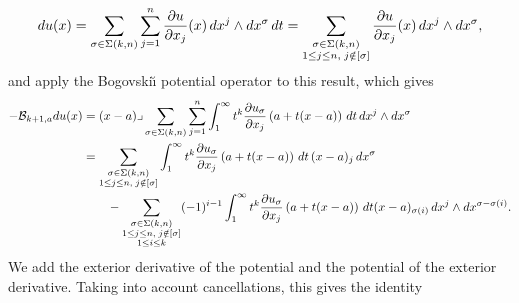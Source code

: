 \documentclass[10pt,a4paper]{article}
\begin{document}
\begin{align*}
    d u(x)
    =
    \sum_{\sigma \in \Sigma(k,n)} \sum_{j=1}^{n}
    \frac{ \partial u }{\partial x_{j}}(x) \,dx^{j} \wedge dx^{\sigma} \,dt 
    =
    \sum_{\substack{ \sigma \in \Sigma(k,n) \\ 1 \leq j \leq n, \; j \notin [\sigma] }}
    \frac{ \partial u }{\partial x_{j}}(x) \,dx^{j} \wedge dx^{\sigma} 
    ,
\end{align*}
and apply the Bogovski\u{\i} potential operator to this result, which gives 
\begin{align*}
    - 
    {\mathcal B}_{k+1,a} d u(x)
    &=
    (x-a)\lrcorner 
    \sum_{\sigma \in \Sigma(k,n)} \sum_{j=1}^{n}
    \int_{1}^\infty t^{k} \frac{ \partial u_{\sigma} }{\partial x_{j}}\left(a+t(x-a)\right) \,dt 
    \,dx^{j} \wedge dx^{\sigma}
    \\&
    = 
    \sum_{\substack{ \sigma \in \Sigma(k,n) \\ 1 \leq j \leq n, \; j \notin [\sigma] }} 
    \int_{1}^\infty t^{k} \frac{ \partial u_{\sigma} }{\partial x_{j}}\left(a+t(x-a)\right) \,dt \,(x-a)_{j} \,dx^{\sigma}
    \\&\qquad 
    - 
    \sum_{\substack{ \sigma \in \Sigma(k,n) \\ 1 \leq j \leq n, \; j \notin [\sigma] \\ 1 \leq i \leq k }}
    (-1)^{i-1}
    \int_{1}^\infty t^{k} \frac{ \partial u_{\sigma} }{\partial x_{j}}\left(a+t(x-a)\right) \,dt 
    (x-a)_{\sigma(i)} \,dx^{j} \wedge dx^{\sigma-\sigma(i)}
    .
\end{align*}
We add the exterior derivative of the potential and the potential of the exterior derivative.
Taking into account cancellations, this gives the identity 
\end{document}
